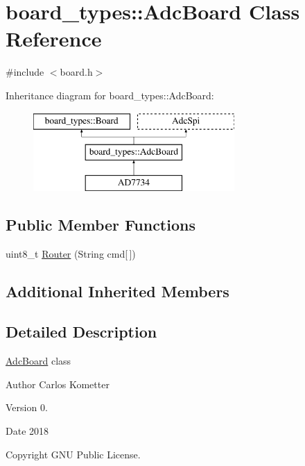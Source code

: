 \hypertarget{classboard__types_1_1AdcBoard}{}\section{board\+\_\+types\+:\+:Adc\+Board Class Reference}
\label{classboard__types_1_1AdcBoard}


{\ttfamily \#include $<$board.\+h$>$}

Inheritance diagram for board\+\_\+types\+:\+:Adc\+Board\+:\begin{figure}[H]
\begin{center}
\leavevmode
\includegraphics[height=3.000000cm]{classboard__types_1_1AdcBoard}
\end{center}
\end{figure}
\subsection*{Public Member Functions}
\begin{DoxyCompactItemize}
\item 
uint8\+\_\+t \mbox{\hyperlink{classboard__types_1_1AdcBoard_aa695e0499e18263c9bf64331375a37b4}{Router}} (String cmd\mbox{[}$\,$\mbox{]})
\end{DoxyCompactItemize}
\subsection*{Additional Inherited Members}


\subsection{Detailed Description}
\mbox{\hyperlink{classboard__types_1_1AdcBoard}{Adc\+Board}} class \begin{DoxyAuthor}{Author}
Carlos Kometter 
\end{DoxyAuthor}
\begin{DoxyVersion}{Version}
0. 
\end{DoxyVersion}
\begin{DoxyDate}{Date}
2018 
\end{DoxyDate}
\begin{DoxyCopyright}{Copyright}
G\+NU Public License. 
\end{DoxyCopyright}


